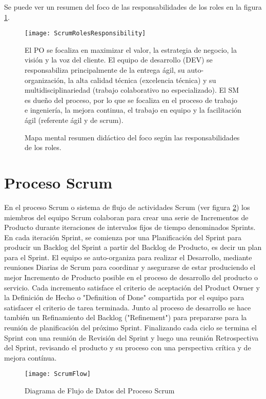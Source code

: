 Se puede ver un resumen del foco de las responsabilidades de los roles en la figura \ref{fig:ScrumRolesResponsibility}.

\begin{figure}
  \centering
  \texttt{[image: ScrumRolesResponsibility]}
  \caption{Mapa mental resumen didáctico del foco según las responsabilidades de los roles.} El PO se focaliza en maximizar el valor, la estrategia de negocio, la visión y la voz del cliente. El equipo de desarrollo (DEV) se responsabiliza principalmente de la entrega ágil, su auto-organización, la alta calidad técnica (excelencia técnica) y su multidisciplinariedad (trabajo colaborativo no especializado). El SM es dueño del proceso, por lo que se focaliza en el proceso de trabajo e ingeniería, la mejora continua, el trabajo en equipo y la facilitación ágil (referente ágil y de scrum).
  \centering
  \label{fig:ScrumRolesResponsibility} %
\end{figure}


\section{Proceso Scrum}

En el proceso Scrum o sistema de flujo de actividades Scrum (ver figura \ref{fig:ScrumFlow}) los miembros del equipo Scrum colaboran para crear una serie de Incrementos de Producto durante iteraciones de intervalos fijos de tiempo denominados Sprints. En cada iteración Sprint, se comienza por una Planificación del Sprint para producir un Backlog del Sprint a partir del Backlog de Producto, es decir un plan para el Sprint. El equipo se auto-organiza para realizar el Desarrollo, mediante reuniones Diarias de Scrum para coordinar y asegurarse de estar produciendo el mejor Incremento de Producto posible en el proceso de desarrollo del producto o servicio. Cada incremento satisface el criterio de aceptación del Product Owner y la Definición de Hecho o "Definition of Done" compartida por el equipo para satisfacer el criterio de tarea terminada. Junto al proceso de desarrollo se hace también un Refinamiento del Backlog ("Refinement") para prepararse para la reunión de planificación del próximo Sprint. Finalizando cada ciclo se termina el Sprint con una reunión de Revisión del Sprint y luego una reunión Retrospectiva del Sprint, revisando el producto y su proceso con una perspectiva crítica y de mejora contínua. 

\begin{figure}[h]
  \centering
  \texttt{[image: ScrumFlow]}
  \caption{Diagrama de Flujo de Datos del Proceso Scrum}
  \centering
  \label{fig:ScrumFlow} %
\end{figure}

